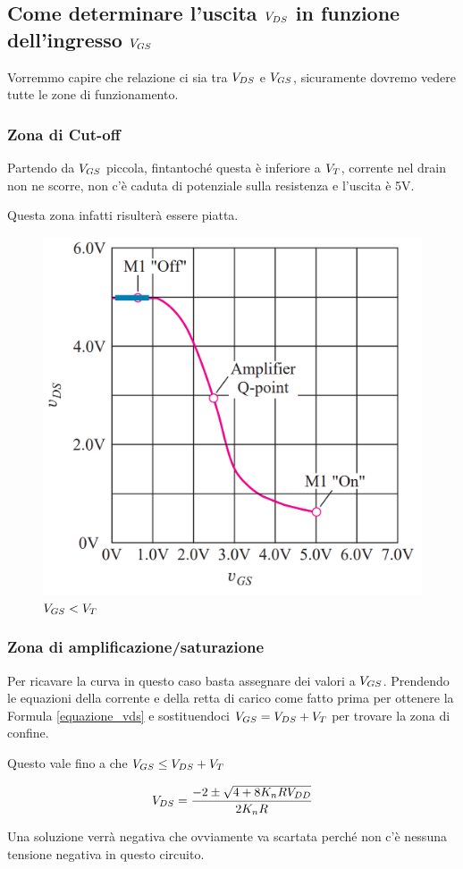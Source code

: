 \newpage
\subsection{Come determinare l'uscita $V_{DS}$ in funzione dell'ingresso $V_{GS}$}

Vorremmo capire che relazione ci sia tra $V_{DS}$ e $V_{GS}$, sicuramente dovremo vedere tutte le zone di funzionamento.

\subsubsection{Zona di Cut-off}

Partendo da $V_{GS}$ piccola, fintantoché questa è inferiore a $V_{T}$, corrente nel drain non ne scorre, non c'è caduta di potenziale sulla resistenza e l'uscita è 5V.

Questa zona infatti risulterà essere piatta.

\begin{figure}[htbp]
    \centering
    \includegraphics[width=0.4\linewidth]{img/IO_off.png}
    \caption{$V_{GS} < V_{T}$}    
\end{figure}

\subsubsection{Zona di amplificazione/saturazione}

Per ricavare la curva in questo caso basta assegnare dei valori a $V_{GS}$. Prendendo le equazioni della corrente e della retta di carico come fatto prima per ottenere la Formula \ref{equazione_vds} e sostituendoci $V_{GS} = V_{DS} + V_{T} $ per trovare la zona di confine.

Questo vale fino a che $V_{GS} \leq V_{DS} + V_{T}$

\begin{equation*}
    V_{DS} = \frac{-2\pm \sqrt{4 + 8K_nRV_{DD}}}{2K_nR}
\end{equation*}

Una soluzione verrà negativa che ovviamente va scartata perché non c'è nessuna tensione negativa in questo circuito.

